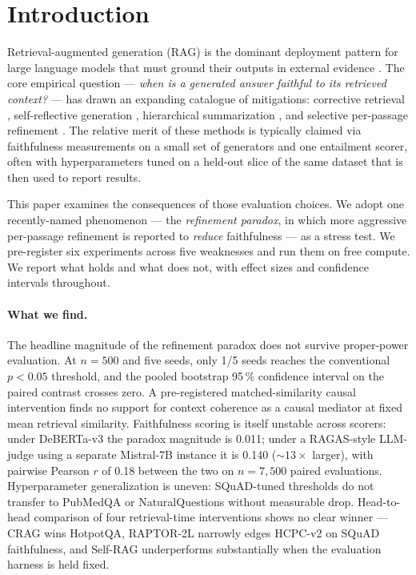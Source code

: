 \section{Introduction}
\label{sec:introduction}

Retrieval-augmented generation (RAG) is the dominant deployment
pattern for large language models that must ground their outputs in
external evidence \citep{lewis2020rag,izacard2020fid,gao2023rag}.
The core empirical question --- \emph{when is a generated answer
faithful to its retrieved context?} --- has drawn an expanding
catalogue of mitigations: corrective retrieval
\citep{yan2024crag}, self-reflective generation
\citep{asai2024selfrag}, hierarchical summarization
\citep{sarthi2024raptor}, and selective per-passage refinement
\citep{xu2023recomp,jiang2023active}. The relative merit of these
methods is typically claimed via faithfulness measurements on a
small set of generators and one entailment scorer, often with
hyperparameters tuned on a held-out slice of the same dataset that
is then used to report results.

This paper examines the consequences of those evaluation choices.
We adopt one recently-named phenomenon ---
the \emph{refinement paradox}, in which more aggressive
per-passage refinement is reported to \emph{reduce} faithfulness ---
as a stress test. We pre-register six experiments across five
weaknesses and run them on free compute. We report what holds and
what does not, with effect sizes and confidence intervals throughout.

\paragraph{What we find.}
The headline magnitude of the refinement paradox does not survive
proper-power evaluation. At \(n{=}500\) and five seeds, only 1/5
seeds reaches the conventional \(p<0.05\) threshold, and the pooled
bootstrap 95\,\% confidence interval on the paired contrast crosses
zero. A pre-registered matched-similarity causal intervention finds
no support for context coherence as a causal mediator at fixed
mean retrieval similarity. Faithfulness scoring is itself unstable
across scorers: under DeBERTa-v3 the paradox magnitude is
0.011; under a RAGAS-style LLM-judge using a separate Mistral-7B
instance it is 0.140 ($\sim 13\times$ larger), with pairwise Pearson
\(r\) of 0.18 between the two on \(n{=}7{,}500\) paired evaluations.
Hyperparameter generalization is uneven: SQuAD-tuned thresholds do
not transfer to PubMedQA or NaturalQuestions without measurable
drop. Head-to-head comparison of four retrieval-time interventions
shows no clear winner --- CRAG wins HotpotQA, RAPTOR-2L narrowly
edges HCPC-v2 on SQuAD faithfulness, and Self-RAG underperforms
substantially when the evaluation harness is held fixed.

